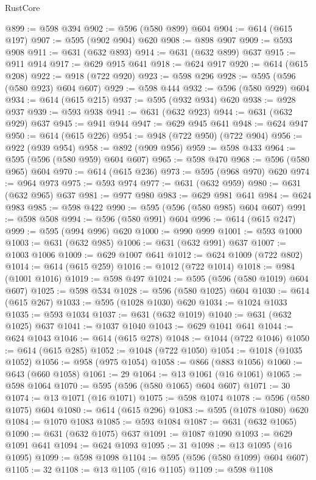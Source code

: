 \begin{lexlean}{RustCore}
\begin{coremodule}
@899 := @598 @394
@902 := @596 (@580 @899) @604
@904 := @614 (@615 @197)
@907 := @595 (@902 @904) @620
@908 := @898 @907
@909 := @593 @908
@911 := @631 (@632 @893)
@914 := @631 (@632 @899) @637
@915 := @911 @914
@917 := @629 @915 @641
@918 := @624 @917
@920 := @614 (@615 @208)
@922 := @918 (@722 @920)
@923 := @598 @296
@928 := @595 (@596 (@580 @923) @604 @607)
@929 := @598 @444
@932 := @596 (@580 @929) @604
@934 := @614 (@615 @215)
@937 := @595 (@932 @934) @620
@938 := @928 @937
@939 := @593 @938
@941 := @631 (@632 @923)
@944 := @631 (@632 @929) @637
@945 := @941 @944
@947 := @629 @945 @641
@948 := @624 @947
@950 := @614 (@615 @226)
@954 := @948 (@722 @950) (@722 @904)
@956 := @922 (@939 @954)
@958 := @892 (@909 @956)
@959 := @598 @433
@964 := @595 (@596 (@580 @959) @604 @607)
@965 := @598 @470
@968 := @596 (@580 @965) @604
@970 := @614 (@615 @236)
@973 := @595 (@968 @970) @620
@974 := @964 @973
@975 := @593 @974
@977 := @631 (@632 @959)
@980 := @631 (@632 @965) @637
@981 := @977 @980
@983 := @629 @981 @641
@984 := @624 @983
@985 := @598 @422
@990 := @595 (@596 (@580 @985) @604 @607)
@991 := @598 @508
@994 := @596 (@580 @991) @604
@996 := @614 (@615 @247)
@999 := @595 (@994 @996) @620
@1000 := @990 @999
@1001 := @593 @1000
@1003 := @631 (@632 @985)
@1006 := @631 (@632 @991) @637
@1007 := @1003 @1006
@1009 := @629 @1007 @641
@1012 := @624 @1009 (@722 @802)
@1014 := @614 (@615 @259)
@1016 := @1012 (@722 @1014)
@1018 := @984 (@1001 @1016)
@1019 := @598 @497
@1024 := @595 (@596 (@580 @1019) @604 @607)
@1025 := @598 @534
@1028 := @596 (@580 @1025) @604
@1030 := @614 (@615 @267)
@1033 := @595 (@1028 @1030) @620
@1034 := @1024 @1033
@1035 := @593 @1034
@1037 := @631 (@632 @1019)
@1040 := @631 (@632 @1025) @637
@1041 := @1037 @1040
@1043 := @629 @1041 @641
@1044 := @624 @1043
@1046 := @614 (@615 @278)
@1048 := @1044 (@722 @1046)
@1050 := @614 (@615 @285)
@1052 := @1048 (@722 @1050)
@1054 := @1018 (@1035 @1052)
@1056 := @958 (@975 @1054)
@1058 := @866 (@883 @1056)
@1060 := @643 (@660 @1058)
@1061 := 29
@1064 := @13 @1061 (@16 @1061)
@1065 := @598 @1064
@1070 := @595 (@596 (@580 @1065) @604 @607)
@1071 := 30
@1074 := @13 @1071 (@16 @1071)
@1075 := @598 @1074
@1078 := @596 (@580 @1075) @604
@1080 := @614 (@615 @296)
@1083 := @595 (@1078 @1080) @620
@1084 := @1070 @1083
@1085 := @593 @1084
@1087 := @631 (@632 @1065)
@1090 := @631 (@632 @1075) @637
@1091 := @1087 @1090
@1093 := @629 @1091 @641
@1094 := @624 @1093
@1095 := 31
@1098 := @13 @1095 (@16 @1095)
@1099 := @598 @1098
@1104 := @595 (@596 (@580 @1099) @604 @607)
@1105 := 32
@1108 := @13 @1105 (@16 @1105)
@1109 := @598 @1108

\end{coremodule}
\end{lexlean}
